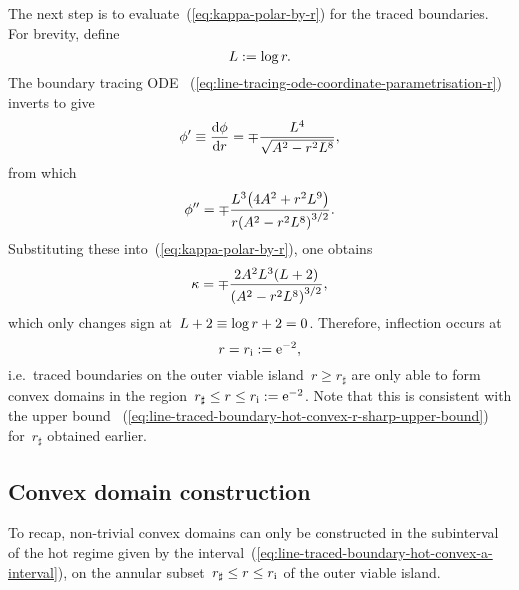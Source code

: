 The next step is to evaluate~(\ref{eq:kappa-polar-by-r})
for the traced boundaries.
For brevity, define
\begin{equation}
  L \defeq \log r.
  \label{eq:line-abbreviation-l}
\end{equation}
The boundary tracing ODE~%
  (\ref{eq:line-tracing-ode-coordinate-parametrisation-r})
inverts to give
\begin{equation}
  \phi' \ideq \tder{\phi}{r} = \mp \frac{L^4}{\sqrt{A^2 - r^2 L^8}},
  \label{eq:line-traced-boundary-phi-r-derivative}
\end{equation}
from which
\begin{equation}
  \phi'' =
  \mp \frac{L^3 \roundbr*{4 A^2 + r^2 L^9}}{r \roundbr*{A^2 - r^2 L^8}^{3/2}}.
  \label{eq:line-traced-boundary-phi-r-second-derivative}
\end{equation}
Substituting these into~(\ref{eq:kappa-polar-by-r}),
one obtains
\begin{equation}
  \kappa =
  \mp \frac{2 A^2 L^3 (L + 2)}{\roundbr*{A^2 - r^2 L^8}^{3/2}},
  \label{eq:line-traced-boundary-kappa-polar-by-r}
\end{equation}
which only changes sign at~$L + 2 \equiv \log r + 2 = 0$.
Therefore, inflection occurs at
\begin{equation}
  r = r_\infl \defeq \ee^{-2},
  \label{eq:line-r-inflection}
\end{equation}
i.e.~traced boundaries on the outer viable island~$r \ge r_\sharp$
are only able to form convex domains
in the region~$r_\sharp \le r \le r_{\mathrm{i}} := \mathrm{e}^{-2}$.
Note that this is consistent with the upper bound~%
  (\ref{eq:line-traced-boundary-hot-convex-r-sharp-upper-bound})
for~$r_\sharp$ obtained earlier.

\subsection{Convex domain construction}
\label{sec:line.convex.construction}

To recap, non-trivial convex domains can only be constructed
in the subinterval of the hot regime
given by the interval~(\ref{eq:line-traced-boundary-hot-convex-a-interval}),
on the annular subset~$r_\sharp \le r \le r_{\mathrm{i}}$
of the outer viable island.

